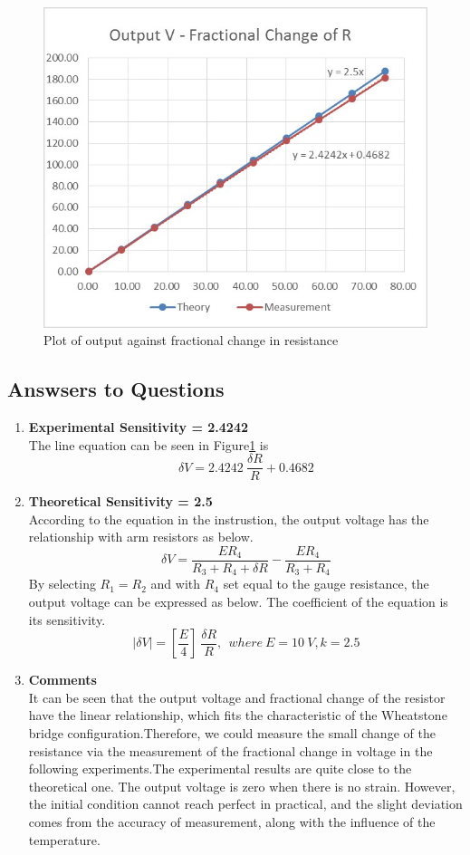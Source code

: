 \documentclass[11pt,a4paper,twoside]{article}
\begin{document}
\begin{figure}[!h]
	\centering
	\includegraphics[width=0.62\linewidth]{2}
	\caption{Plot of output against fractional change in resistance}
	\label{f2}
\end{figure}

\subsection{Answsers to Questions}
\begin{enumerate}
	\item 
\textbf{	Experimental Sensitivity = 2.4242} \\
	The line equation can be seen in Figure\ref{f2} is \\
	\begin{equation}
	  \delta V = 2.4242\ \frac{\delta R}{R} + 0.4682
	\end{equation}
	
	\item
\textbf{	Theoretical Sensitivity = 2.5} \\
	According to the equation in the instrustion, the output voltage has the relationship with arm resistors as below. 
		\begin{equation}
		\delta V = \frac{ER_{4}}{R_{3}+R_{4}+\delta R} - \frac{ER_{4}}{R_{3}+R_{4}}
		\end{equation}
	By selecting $R_{1}=R_{2}$ and with $R_{4}$ set equal to the gauge resistance, the output voltage can be expressed as below. The coefficient of the equation is its sensitivity. 
		\begin{equation}
		|\delta V |=\left[ \frac{E}{4}\right] \ \frac{\delta R}{R}, \ \ where\ E=10\ V, k=2.5
		\end{equation}
		
	\item
\textbf{	Comments}\\
	It can be seen that the output voltage and fractional change of the resistor have the linear relationship, which fits the characteristic of the Wheatstone bridge configuration.Therefore, we could measure the small change of the resistance via the measurement of the fractional change in voltage in the following experiments.The experimental results are quite close to the theoretical one. The output voltage is zero when there is no strain. However, the initial condition cannot reach perfect in practical, and the slight deviation comes from the accuracy of measurement, along with the influence of the temperature. 
\end{enumerate}
\pagebreak
\end{document}
